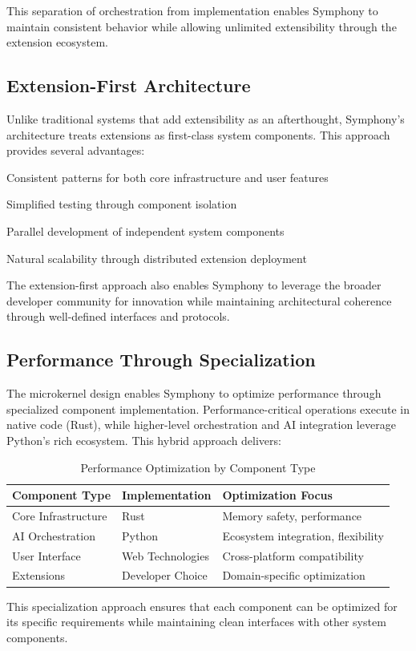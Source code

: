 This separation of orchestration from implementation enables Symphony to maintain consistent behavior while allowing unlimited extensibility through the extension ecosystem.

\subsection*{Extension-First Architecture}

Unlike traditional systems that add extensibility as an afterthought, Symphony's architecture treats extensions as \textcolor{brandAccent}{first-class system components}. This approach provides several advantages:

\begin{infobox}[title=Extension-First Benefits]
\begin{compactlist}
    \item Consistent patterns for both core infrastructure and user features
    \item Simplified testing through component isolation
    \item Parallel development of independent system components
    \item Natural scalability through distributed extension deployment
\end{compactlist}
\end{infobox}

The extension-first approach also enables Symphony to leverage the broader developer community for innovation while maintaining architectural coherence through well-defined interfaces and protocols.

\subsection*{Performance Through Specialization}

The microkernel design enables Symphony to optimize performance through \textcolor{brandTertiary}{specialized component implementation}. Performance-critical operations execute in native code (Rust), while higher-level orchestration and AI integration leverage Python's rich ecosystem. This hybrid approach delivers:

\begin{table}[ht]
\centering
\begin{tabular}{@{}lll@{}}
\toprule
\textbf{Component Type} & \textbf{Implementation} & \textbf{Optimization Focus} \\
\midrule
Core Infrastructure & Rust & Memory safety, performance \\
AI Orchestration & Python & Ecosystem integration, flexibility \\
User Interface & Web Technologies & Cross-platform compatibility \\
Extensions & Developer Choice & Domain-specific optimization \\
\bottomrule
\end{tabular}
\caption{Performance Optimization by Component Type}
\end{table}

This specialization approach ensures that each component can be optimized for its specific requirements while maintaining clean interfaces with other system components.
